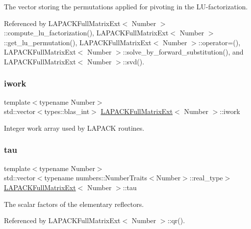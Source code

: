 The vector storing the permutations applied for pivoting in the L\+U-\/factorization. 

Referenced by L\+A\+P\+A\+C\+K\+Full\+Matrix\+Ext$<$ Number $>$\+::compute\+\_\+lu\+\_\+factorization(), L\+A\+P\+A\+C\+K\+Full\+Matrix\+Ext$<$ Number $>$\+::get\+\_\+lu\+\_\+permutation(), L\+A\+P\+A\+C\+K\+Full\+Matrix\+Ext$<$ Number $>$\+::operator=(), L\+A\+P\+A\+C\+K\+Full\+Matrix\+Ext$<$ Number $>$\+::solve\+\_\+by\+\_\+forward\+\_\+substitution(), and L\+A\+P\+A\+C\+K\+Full\+Matrix\+Ext$<$ Number $>$\+::svd().

\mbox{\label{classLAPACKFullMatrixExt_ac091f1f6af485b451c4c9398abb67230}} 
\subsubsection{\texorpdfstring{iwork}{iwork}}
{\footnotesize\ttfamily template$<$typename Number$>$ \\
std\+::vector$<$types\+::blas\+\_\+int$>$ \hyperlink{classLAPACKFullMatrixExt}{L\+A\+P\+A\+C\+K\+Full\+Matrix\+Ext}$<$ Number $>$\+::iwork\hspace{0.3cm}{\ttfamily [private]}}

Integer work array used by L\+A\+P\+A\+CK routines. \mbox{\label{classLAPACKFullMatrixExt_a91fb784892cbe9d24ad2062fbf642635}} 
\subsubsection{\texorpdfstring{tau}{tau}}
{\footnotesize\ttfamily template$<$typename Number$>$ \\
std\+::vector$<$typename numbers\+::\+Number\+Traits$<$Number$>$\+::real\+\_\+type$>$ \hyperlink{classLAPACKFullMatrixExt}{L\+A\+P\+A\+C\+K\+Full\+Matrix\+Ext}$<$ Number $>$\+::tau\hspace{0.3cm}{\ttfamily [private]}}

The scalar factors of the elementary reflectors. 

Referenced by L\+A\+P\+A\+C\+K\+Full\+Matrix\+Ext$<$ Number $>$\+::qr().

